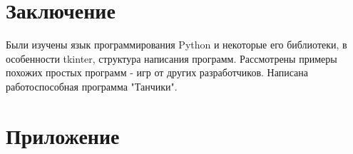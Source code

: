 \documentclass[14pt, oneside]{altsu-report}
\begin{document}




\chapter*{Заключение}

Были изучены язык программирования Python и некоторые его библиотеки, в особенности tkinter, структура написания программ. Рассмотрены примеры похожих простых программ - игр от других разработчиков. Написана работоспособная программа "Танчики".

\newpage
{}
\printbibliography[title={Список использованной литературы}]

\appendix
\newpage
\chapter*{\raggedleft\label{appendix1}Приложение}
\end{document}
